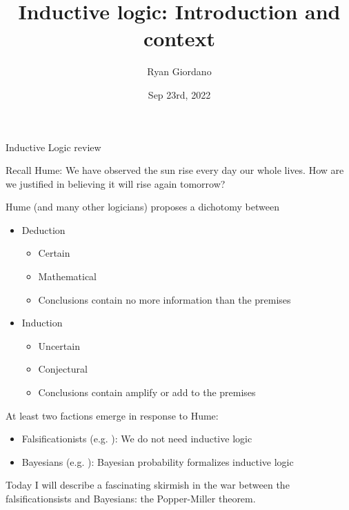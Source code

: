 \documentclass[8pt]{beamer}\usepackage[]{graphicx}\usepackage[]{color}
\title{Inductive logic: Introduction and context}
\author{Ryan Giordano}
\date{Sep 23rd, 2022}
\institute{Massachusetts Institute of Technology}
\begin{document}

\begin{frame}{Inductive Logic review}

Recall Hume: We have observed the sun rise every day our whole lives.  How are
we justified in believing it will rise again tomorrow?

Hume (and many other logicians) proposes a dichotomy between
%
\begin{itemize}
%
\item Deduction
%
\begin{itemize}
%
\item Certain
\item Mathematical
\item Conclusions contain no more information than the premises
%
\end{itemize}
%
\item Induction
\begin{itemize}
%
\item Uncertain
\item Conjectural
\item Conclusions contain amplify or add to the premises
%
\end{itemize}
%
\end{itemize}
%
\pause
At least two factions emerge in response to Hume:
%
\begin{itemize}
%
\item Falsificationists (e.g. \cite{popper:1963:scienceasfalsification}):
    We do not need inductive logic
%
\item Bayesians (e.g. \cite{carnap:1966:aimofinductivelogic}):
    Bayesian probability formalizes inductive logic
%
\end{itemize}
%
Today I will describe a fascinating skirmish in the war between the
falsificationsists and Bayesians: the Popper-Miller theorem.
%
\end{frame}

\end{document}
